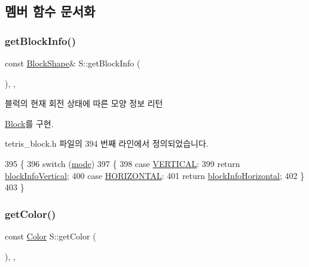 \subsection{멤버 함수 문서화}
\mbox{\label{class_s_aedd52f4a59ed94415945a54e0a1a477b}} 
\subsubsection{\texorpdfstring{get\+Block\+Info()}{getBlockInfo()}}
{\footnotesize\ttfamily const \mbox{\hyperlink{class_block_aca5d951639f113e2ebd7856209d6b9ab}{Block\+Shape}}\& S\+::get\+Block\+Info (\begin{DoxyParamCaption}{ }\end{DoxyParamCaption})\hspace{0.3cm}{\ttfamily [inline]}, {\ttfamily [override]}, {\ttfamily [virtual]}}



블럭의 현재 회전 상태에 따른 모양 정보 리턴 



\mbox{\hyperlink{class_block_a2cdc0af223d621add42ac6c37fede329}{Block}}를 구현.



tetris\+\_\+block.\+h 파일의 394 번째 라인에서 정의되었습니다.


\begin{DoxyCode}
395     \{
396         \textcolor{keywordflow}{switch} (\mbox{\hyperlink{class_s_a0a3c150f9afbfe65a5558d947b999776}{mode}})
397         \{
398         \textcolor{keywordflow}{case} \mbox{\hyperlink{class_block_a33a96023993478ad4b52426188454765a76628d7877667ccb2f6e549b89466a4a}{VERTICAL}}:
399             \textcolor{keywordflow}{return} \mbox{\hyperlink{class_s_a4dfa7559187c41616256612400bcaab7}{blockInfoVertical}};
400         \textcolor{keywordflow}{case} \mbox{\hyperlink{class_block_a33a96023993478ad4b52426188454765a883bda1b4a0cb6d25d8b3c3465f0cfef}{HORIZONTAL}}:
401             \textcolor{keywordflow}{return} \mbox{\hyperlink{class_s_ac96253e642b4d209abc7ea47aa687999}{blockInfoHorizontal}};
402         \}
403     \}
\end{DoxyCode}
\mbox{\label{class_s_a6b0a59fa5ae754544d2ad1c250f8dece}} 
\subsubsection{\texorpdfstring{get\+Color()}{getColor()}}
{\footnotesize\ttfamily const \mbox{\hyperlink{class_block_ad054b4ac51df79aa910040b2a2fdf7b5}{Color}} S\+::get\+Color (\begin{DoxyParamCaption}{ }\end{DoxyParamCaption})\hspace{0.3cm}{\ttfamily [inline]}, {\ttfamily [override]}, {\ttfamily [virtual]}}



